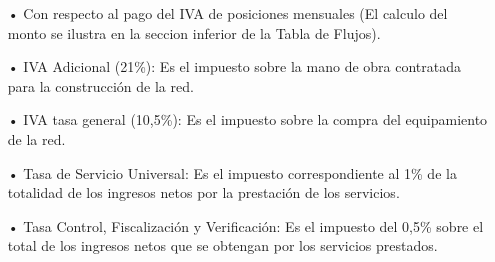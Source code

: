 \begin{enumerate}
\begin{enumerate}
\item[•]Con respecto al pago del IVA de posiciones mensuales (El calculo del monto se ilustra en la seccion inferior de la Tabla de Flujos).



\item[•]IVA Adicional (21\%): Es el impuesto sobre la mano de obra contratada para la construcción de la red.

\item[•]IVA tasa general (10,5\%): Es el impuesto sobre la compra del equipamiento de la red.

\item[•]Tasa de Servicio Universal: Es el impuesto correspondiente al 1\% de la totalidad de los ingresos netos por la prestación de los servicios.

\item[•]Tasa Control, Fiscalización y Verificación: Es el impuesto del 0,5\% sobre el total de los ingresos netos que se obtengan por los servicios prestados.

\end{enumerate}



%


%
%
%
%





\end{enumerate}